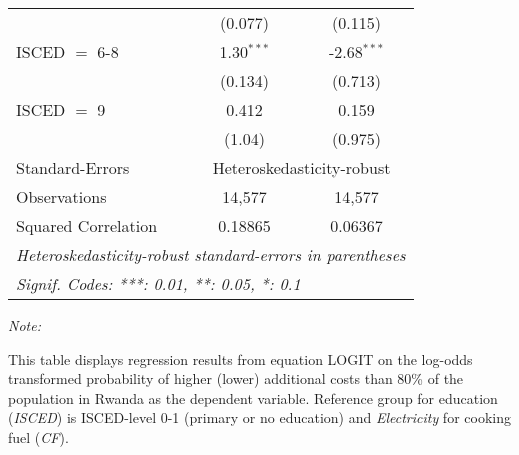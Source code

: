 \begin{table}[htbp!]
\begin{adjustbox}{width = 1\textwidth, max height = 0.95\textheight, center}
\begin{threeparttable}[b]
\begin{tabular}{lcc}
                                 & (0.077)       & (0.115)\\   
            ISCED $=$ 6-8        & 1.30$^{***}$  & -2.68$^{***}$\\   
                                 & (0.134)       & (0.713)\\   
            ISCED $=$ 9          & 0.412         & 0.159\\   
                                 & (1.04)        & (0.975)\\   
            \midrule 
            Standard-Errors & \multicolumn{2}{c}{Heteroskedasticity-robust} \\ 
            Observations         & 14,577        & 14,577\\  
            Squared Correlation  & 0.18865       & 0.06367\\  
            \midrule \midrule
            \multicolumn{3}{l}{\emph{Heteroskedasticity-robust standard-errors in parentheses}}\\
            \multicolumn{3}{l}{\emph{Signif. Codes: ***: 0.01, **: 0.05, *: 0.1}}\\
         \end{tabular}
         
         \begin{tablenotes}\item \medskip \textit{Note:}
            \item This table displays regression results from equation LOGIT on the log-odds transformed probability of higher (lower) additional costs than 80\% of the population in Rwanda as the dependent variable. Reference group for education (\textit{ISCED}) is ISCED-level 0-1 (primary or no education) and \textit{Electricity} for cooking fuel (\textit{CF}).
         \end{tablenotes}
      \end{threeparttable}
   \end{adjustbox}
\end{table}


